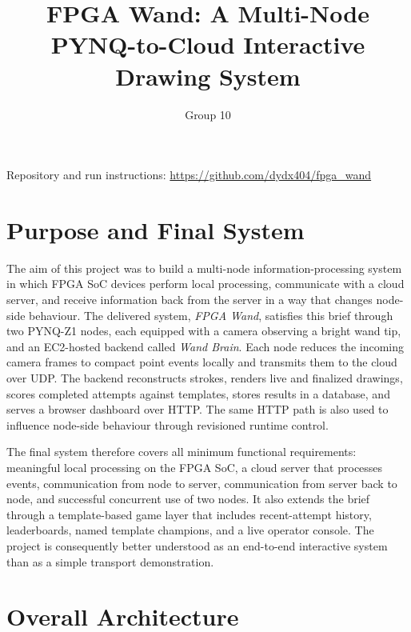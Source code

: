 \documentclass[10pt,a4paper]{article}
\title{\vspace{-1.2em}\textbf{FPGA Wand: A Multi-Node PYNQ-to-Cloud Interactive Drawing System}\vspace{-0.6em}}
\author{Group 10}
\date{}
\begin{document}
\maketitle
\vspace{-1.4em}
\begin{center}
\small Repository and run instructions: \url{https://github.com/dydx404/fpga_wand}
\end{center}
\vspace{-0.7em}

\section{Purpose and Final System}

The aim of this project was to build a multi-node information-processing system
in which FPGA SoC devices perform local processing, communicate with a cloud
server, and receive information back from the server in a way that changes
node-side behaviour. The delivered system, \emph{FPGA Wand}, satisfies this
brief through two PYNQ-Z1 nodes, each equipped with a camera observing a bright
wand tip, and an EC2-hosted backend called \emph{Wand Brain}. Each node reduces
the incoming camera frames to compact point events locally and transmits them to
the cloud over UDP. The backend reconstructs strokes, renders live and
finalized drawings, scores completed attempts against templates, stores results
in a database, and serves a browser dashboard over HTTP. The same HTTP path is
also used to influence node-side behaviour through revisioned runtime control.

The final system therefore covers all minimum functional requirements:
meaningful local processing on the FPGA SoC, a cloud server that processes
events, communication from node to server, communication from server back to
node, and successful concurrent use of two nodes. It also extends the brief
through a template-based game layer that includes recent-attempt history,
leaderboards, named template champions, and a live operator console. The
project is consequently better understood as an end-to-end interactive system
than as a simple transport demonstration.

\section{Overall Architecture}
\end{document}
